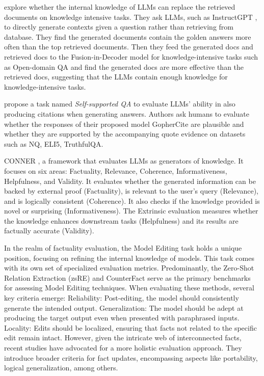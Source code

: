 \citet{yu2023generate} explore whether the internal knowledge of LLMs can replace the retrieved documents on knowledge intensive tasks. They ask LLMs, such as InstructGPT \citep{gpt35}, to directly generate contexts given a question rather than retrieving from database. They find the generated documents contain the golden answers more often than the top retrieved documents. Then they feed the generated docs and retrieved docs to the Fusion-in-Decoder model \citep{Fusion-in-Decoder} for knowledge-intensive tasks such as Open-domain QA \citep{NQ} and find the generated docs are more effective than the retrieved docs, suggesting that the LLMs contain enough knowledge for knowledge-intensive tasks.

\citet{menick2022teaching} propose a task named \textit{Self-supported QA} to evaluate LLMs' ability in also producing citations when generating answers. Authors ask humans to evaluate whether the responses of their proposed model GopherCite are plausible and whether they are supported by the accompanying quote evidence on datasets such as NQ, ELI5, TruthfulQA.



CONNER \citep{chen2023beyond}, a framework that evaluates LLMs as generators of knowledge. It focuses on six areas: Factuality, Relevance, Coherence, Informativeness, Helpfulness, and Validity. It evaluates whether the generated information can be backed by external proof (Factuality), is relevant to the user's query (Relevance), and is logically consistent (Coherence). It also checks if the knowledge provided is novel or surprising (Informativeness). The Extrinsic evaluation measures whether the knowledge enhances downstream tasks (Helpfulness) and its results are factually accurate (Validity). 

In the realm of factuality evaluation, the Model Editing task holds a unique position, focusing on refining the internal knowledge of models. This task comes with its own set of specialized evaluation metrics. Predominantly, the Zero-Shot Relation Extraction (zsRE) \cite{ZsRE} and CounterFact \cite{meng2022locating} serve as the primary benchmarks for assessing Model Editing techniques. When evaluating these methods, several key criteria emerge:
Reliability: Post-editing, the model should consistently generate the intended output.
Generalization: The model should be adept at producing the target output even when presented with paraphrased inputs.
Locality: Edits should be localized, ensuring that facts not related to the specific edit remain intact.
However, given the intricate web of interconnected facts, recent studies \citet{zhong2023mquake,yao2023editing,cohen2023evaluating} have advocated for a more holistic evaluation approach. They introduce broader criteria for fact updates, encompassing aspects like portability, logical generalization, among others.

